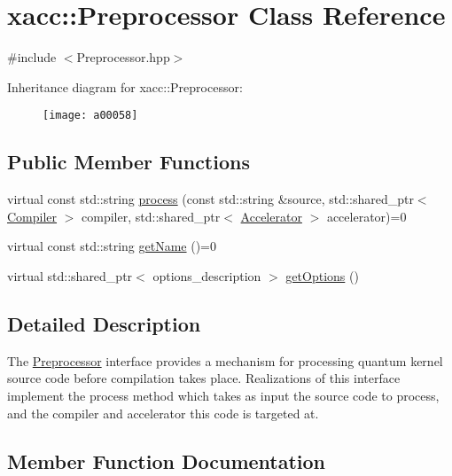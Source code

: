 \hypertarget{a00058}{}\section{xacc\+:\+:Preprocessor Class Reference}
\label{a00058}


{\ttfamily \#include $<$Preprocessor.\+hpp$>$}

Inheritance diagram for xacc\+:\+:Preprocessor\+:\begin{figure}[H]
\begin{center}
\leavevmode
\texttt{[image: a00058]}
\end{center}
\end{figure}
\subsection*{Public Member Functions}
\begin{DoxyCompactItemize}
\item 
virtual const std\+::string \hyperlink{a00058_ae59b5a2963f8bcc84b590a83f4749e19}{process} (const std\+::string \&source, std\+::shared\+\_\+ptr$<$ \hyperlink{a00023}{Compiler} $>$ compiler, std\+::shared\+\_\+ptr$<$ \hyperlink{a00011}{Accelerator} $>$ accelerator)=0
\item 
virtual const std\+::string \hyperlink{a00058_a36671f4c062d61e230306edc404774cd}{get\+Name} ()=0
\item 
virtual std\+::shared\+\_\+ptr$<$ options\+\_\+description $>$ \hyperlink{a00058_a96f5600ea47628b66917c7b90250e7f1}{get\+Options} ()
\end{DoxyCompactItemize}


\subsection{Detailed Description}
The \hyperlink{a00058}{Preprocessor} interface provides a mechanism for processing quantum kernel source code before compilation takes place. Realizations of this interface implement the process method which takes as input the source code to process, and the compiler and accelerator this code is targeted at. 

\subsection{Member Function Documentation}
